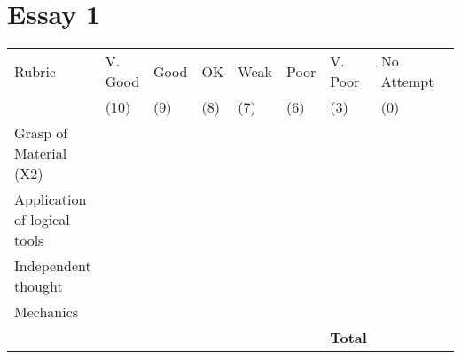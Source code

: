 \documentclass[11pt,article,oneside]{memoir}
\begin{document}
\section*{Essay 1}
\begin{center}


\resizebox{14cm}{!} {
    \begin{tabular}{ | l | l | l | l | l | l | l | l | l |    }
    \hline
    Rubric &  V. Good & Good & OK & Weak & Poor & V. Poor & No Attempt \\  
	 & (10) & (9) & (8) & (7) & (6) & (3)  & (0) \\    \hline
    Grasp of Material (X2) & & & & & & &\\ \hline   
    Application of logical tools &  & & & & & &\\ \hline
	Independent thought &  & & & & & &\\ \hline
 Mechanics & & & & & &  &\\ \hline \hline
 & &  & & &  & \textbf{Total}  & \\ \hline
    \end{tabular}
}


\end{center}




\end{document}
